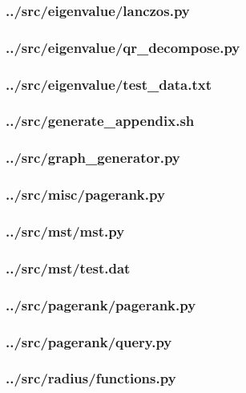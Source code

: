 \subsubsection{../src/eigenvalue/lanczos.py}

\subsubsection{../src/eigenvalue/qr\_decompose.py}

\subsubsection{../src/eigenvalue/test\_data.txt}

\subsubsection{../src/generate\_appendix.sh}

\subsubsection{../src/graph\_generator.py}

\subsubsection{../src/misc/pagerank.py}

\subsubsection{../src/mst/mst.py}

\subsubsection{../src/mst/test.dat}

\subsubsection{../src/pagerank/pagerank.py}

\subsubsection{../src/pagerank/query.py}

\subsubsection{../src/radius/functions.py}

